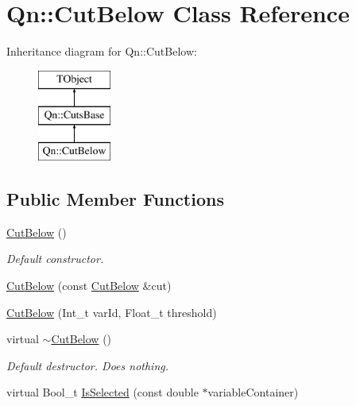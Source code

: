 \hypertarget{classQn_1_1CutBelow}{}\section{Qn\+:\+:Cut\+Below Class Reference}
\label{classQn_1_1CutBelow}
Inheritance diagram for Qn\+:\+:Cut\+Below\+:\begin{figure}[H]
\begin{center}
\leavevmode
\includegraphics[height=3.000000cm]{classQn_1_1CutBelow}
\end{center}
\end{figure}
\subsection*{Public Member Functions}
\begin{DoxyCompactItemize}
\item 
\mbox{\label{classQn_1_1CutBelow_aca2f904a16d3201a5a6ece6e644b2b82}} 
\mbox{\hyperlink{classQn_1_1CutBelow_aca2f904a16d3201a5a6ece6e644b2b82}{Cut\+Below}} ()
\begin{DoxyCompactList}\small\item\em Default constructor. \end{DoxyCompactList}\item 
\mbox{\hyperlink{classQn_1_1CutBelow_a68cce8c01e9c787e9f7fb1fcd90e9eca}{Cut\+Below}} (const \mbox{\hyperlink{classQn_1_1CutBelow}{Cut\+Below}} \&cut)
\item 
\mbox{\hyperlink{classQn_1_1CutBelow_a62dec52f3fc28e603ee8e355c4885c6b}{Cut\+Below}} (Int\+\_\+t var\+Id, Float\+\_\+t threshold)
\item 
\mbox{\label{classQn_1_1CutBelow_a7ad873672fd0b6dcec2e865a69cf2bae}} 
virtual \mbox{\hyperlink{classQn_1_1CutBelow_a7ad873672fd0b6dcec2e865a69cf2bae}{$\sim$\+Cut\+Below}} ()
\begin{DoxyCompactList}\small\item\em Default destructor. Does nothing. \end{DoxyCompactList}\item 
virtual Bool\+\_\+t \mbox{\hyperlink{classQn_1_1CutBelow_ae7ea2216ffcf3e65c0dd89b04ff9bf21}{Is\+Selected}} (const double $\ast$variable\+Container)
\end{DoxyCompactItemize}
